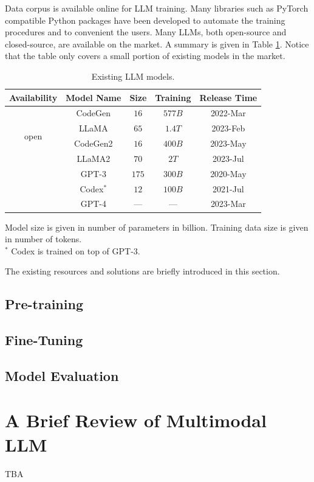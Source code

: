 Data corpus is available online for LLM training. Many libraries such as PyTorch compatible Python packages have been developed to automate the training procedures and to convenient the users. Many LLMs, both open-source and closed-source, are available on the market. A summary is given in Table \ref{ch:llm:tab:existingmodel}. Notice that the table only covers a small portion of existing models in the market.

\begin{table}
	\centering \caption{Existing LLM models.}\label{ch:llm:tab:existingmodel}
	\begin{tabular}{ccccc}
		\hline
		Availability & Model Name & Size & Training & Release Time \\ \hline
		\multirow{4}{*}{open} & CodeGen & $16$ & $577B$ & 2022-Mar \\
		 & LLaMA & $65$ & $1.4T$ & 2023-Feb \\
		 & CodeGen2 & $16$ & $400B$ & 2023-May \\
		 & LLaMA2 & $70$ & $2T$ & 2023-Jul \\ \hdashline
		\multirow{3}{*}{closed} & GPT-3 & $175$ & $300B$ & 2020-May \\
		 & Codex$^*$ & $12$ & $100B$ & 2021-Jul \\
		 & GPT-4 & --- & --- & 2023-Mar \\
		\hline
	\end{tabular}
\begin{flushleft}
	\footnotesize
	Model size is given in number of parameters in billion. Training data size is given in number of tokens. \\
	$^*$ Codex is trained on top of GPT-3.
\end{flushleft}
\end{table}

The existing resources and solutions are briefly introduced in this section.

\subsection{Pre-training}

\subsection{Fine-Tuning}

\subsection{Model Evaluation}

\section{A Brief Review of Multimodal LLM}

TBA

